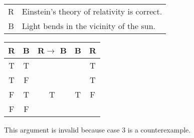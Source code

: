 \begin{tabular}{r l}
    R & Einstein's theory of relativity is correct. \\
    B & Light bends in the vicinity of the sun.
\end{tabular}

\begin{tabular}{c|c||c|c||c}
    R & B & R$\rightarrow$ B & B & R \\
    \hline
    T & T &   &   & T \\
    T & F &   &   & T \\
    F & T & T & T & F \\
    F & F &   &   &  
\end{tabular}

\noindent This argument is invalid because case 3 is a counterexample.